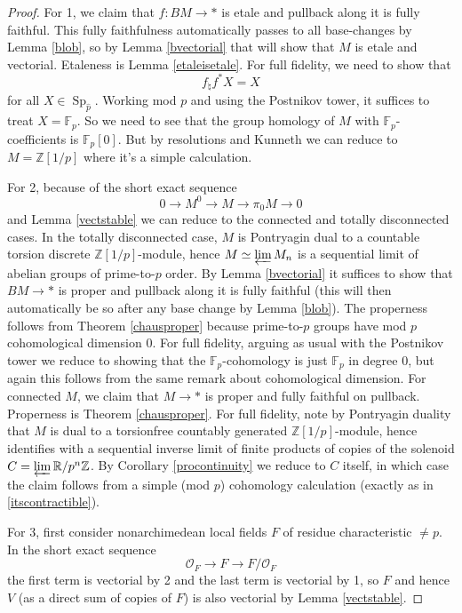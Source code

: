 \documentclass[12pt]{article}
\newcommand{\on}{\operatorname}
\newcommand{\mc}{\mathcal}
\newcommand{\mbb}{\mathbb}
\newcommand{\wh}{\widehat}
\begin{document}
\begin{proof}
For 1, we claim that $f:BM\to \ast$ is etale and pullback along it is fully faithful.  This fully faithfulness automatically passes to all base-changes by Lemma \ref{blob}, so by Lemma \ref{bvectorial} that will show that $M$ is etale and vectorial.  Etaleness is Lemma \ref{etaleisetale}.  For full fidelity, we need to show that
$$f_\natural f^\ast X = X$$
for all $X\in\on{Sp}_{\wh{p}}$.  Working mod $p$ and using the Postnikov tower, it suffices to treat $X=\mbb{F}_p$.  So we need to see that the group homology of $M$ with $\mbb{F}_p$-coefficients is $\mbb{F}_p[0]$.  But by resolutions and Kunneth we can reduce to $M=\mbb{Z}[1/p]$ where it's a simple calculation.

For 2, because of the short exact sequence
$$0\to M^0 \to M \to \pi_0M\to 0$$
and Lemma \ref{vectstable} we can reduce to the connected and totally disconnected cases.  In the totally disconnected case, $M$ is Pontryagin dual to a countable torsion discrete $\mbb{Z}[1/p]$-module, hence $M\simeq \varprojlim M_n$ is a sequential limit of abelian groups of prime-to-$p$ order.  By Lemma \ref{bvectorial} it suffices to show that $BM\to \ast$ is proper and pullback along it is fully faithful (this will then automatically be so after any base change by Lemma \ref{blob}).   The properness follows from Theorem \ref{chausproper} because prime-to-$p$ groups have mod $p$ cohomological dimension $0$.  For full fidelity, arguing as usual with the Postnikov tower we reduce to showing that the $\mbb{F}_p$-cohomology is just $\mbb{F}_p$ in degree $0$, but again this follows from the same remark about cohomological dimension.  For connected $M$, we claim that $M\to \ast$ is proper and fully faithful on pullback.  Properness is Theorem \ref{chausproper}.  For full fidelity, note by Pontryagin duality that $M$ is dual to a torsionfree countably generated $\mbb{Z}[1/p]$-module, hence identifies with a sequential inverse limit of finite products of copies of the solenoid $C=\varprojlim\mbb{R}/p^n\mbb{Z}$.  By Corollary \ref{procontinuity} we reduce to $C$ itself, in which case the claim follows from a simple (mod $p$) cohomology calculation (exactly as in \ref{itscontractible}).

For 3, first consider nonarchimedean local fields $F$ of residue characteristic $\neq p$.  In the short exact sequence
$$\mc{O}_F\to F\to F/\mc{O}_F$$
the first term is vectorial by 2 and the last term is vectorial by 1, so $F$ and hence $V$ (as a direct sum of copies of $F$) is also vectorial by Lemma \ref{vectstable}.


\end{proof}
\end{document}

